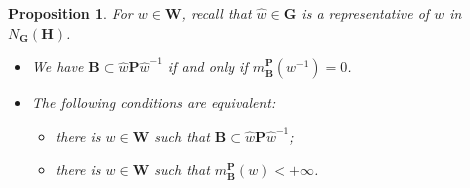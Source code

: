 \documentclass[12pt]{amsart}
\newtheorem{proposition}{Proposition}
\theoremstyle{definition}
\begin{document}
\begin{proposition}
\label{proposition-9-new}
For $w\in\mathbf{W}$, recall that $\hat{w}\in\mathbf{G}$ is a representative of $w$ in $N_\mathbf{G}(\mathbf{H})$.
\begin{itemize}
\item[{\rm (a)}] We have $\mathbf{B}\subset \hat{w}\mathbf{P}\hat{w}^{-1}$ if and only if $m_\mathbf{B}^\mathbf{P}(w^{-1})=0$.
\item[{\rm (b)}] The following conditions are equivalent:
\begin{itemize}
\item[\rm (i)] there is $w\in\mathbf{W}$ such that $\mathbf{B}\subset \hat{w}\mathbf{P}\hat{w}^{-1}$;
\item[\rm (ii)] there is $w\in\mathbf{W}$ such that $m_\mathbf{B}^\mathbf{P}(w)<+\infty$.
\end{itemize}
\end{itemize}
\end{proposition}
\end{document}

